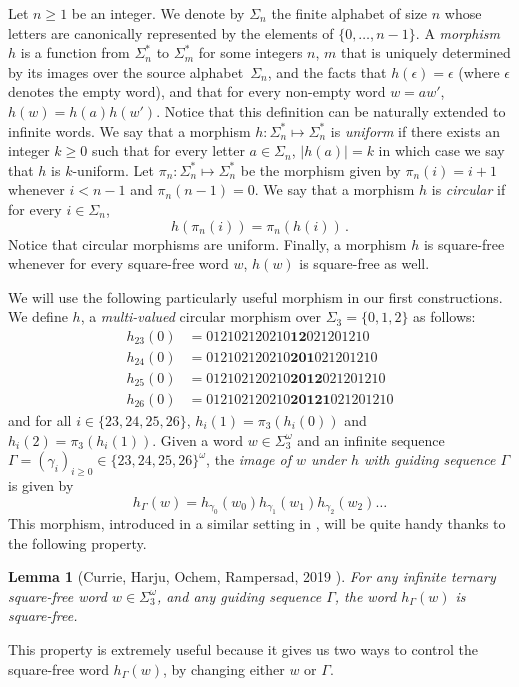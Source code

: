 \documentclass[12pt]{article}
\newtheorem{lemma}[theorem]{Lemma}
\theoremstyle{definition}
\begin{document}
Let $n \geq 1$ be an integer. We denote by $\Sigma_n$ the finite alphabet of size $n$ whose letters are canonically represented by the elements of $\{0, \dots, n - 1\}$. A \emph{morphism} $h$ is a function from $\Sigma_n^*$ to $\Sigma_m^*$ for some integers $n$, $m$ that is uniquely determined by its images over the source alphabet~$\Sigma_n$, and the facts that $h(\epsilon) = \epsilon$ (where $\epsilon$ denotes the empty word), and that for every non-empty word $w = aw'$, $h(w) = h(a)h(w')$. Notice that this definition can be naturally extended to infinite words. We say that a morphism $h : \Sigma_n^* \mapsto \Sigma_n^*$ is \emph{uniform} if there exists an integer $k \geq 0$ such that for every letter $a \in \Sigma_n$, $|h(a)| = k$ in which case we say that $h$ is $k$-uniform.
Let $\pi_n : \Sigma_n^* \mapsto \Sigma_n^*$ be the morphism given by $\pi_n(i) = i + 1$ whenever $i < n - 1$ and $\pi_n(n - 1) = 0$.
We say that a  morphism $h$ is \emph{circular} if for every $i \in \Sigma_n$, $$h(\pi_n(i)) = \pi_n(h(i))\,.$$
Notice that circular morphisms are uniform.
Finally, a morphism $h$ is square-free whenever for every square-free word $w$, $h(w)$ is square-free as well. 

We will use the following particularly useful morphism in our first constructions. We define $h$, a \emph{multi-valued} circular morphism over $\Sigma_3 = \{0, 1, 2\}$ as follows:
\begin{align*}
h_{23}(0)&=012102120210\mathbf{12}021201210\\
h_{24}(0)&=012102120210\mathbf{201}021201210\\
h_{25}(0)&=012102120210\mathbf{2012}021201210\\
h_{26}(0)&=012102120210\mathbf{20121}021201210
\end{align*}
and for all $i\in\{23,24,25,26\}$, $h_i(1)=\pi_3(h_i(0))$ and  $h_i(2)=\pi_3(h_i(1))$.
Given a word $w\in\Sigma_3^\omega$ and an infinite sequence $\Gamma=(\gamma_i)_{i\ge0}\in \{23,24,25,26\}^\omega$, the \emph{image of $w$ under $h$ with guiding sequence $\Gamma$} is given by 
$$h_{\Gamma}(w)=h_{\gamma_0}(w_0)h_{\gamma_1}(w_1)h_{\gamma_2}(w_2)\ldots$$
This morphism, introduced in a similar setting in \cite{ArithmeticProgressions}, will be quite handy thanks to the following property.
\begin{lemma}[Currie, Harju, Ochem, Rampersad, 2019 \cite{ArithmeticProgressions}]\label{lemma:h_is_squarefree}
For any infinite ternary square-free word $w\in\Sigma_3^\omega$, and any guiding sequence $\Gamma$, the word
$h_{\Gamma}(w)$ is square-free.
\end{lemma}
This property is extremely useful because it gives us two ways to control the square-free word $h_{\Gamma}(w)$, by changing either $w$ or $\Gamma$.
\end{document}
